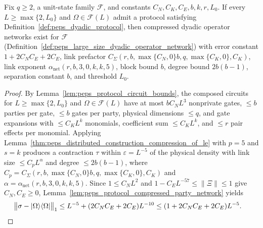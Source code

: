 \begin{lemma}
    \label{thm:peps_large_size_network_from_protocol}
    \leanok
    Fix $q\ge2$, a unit-state family $\mathcal F$, and constants
    $C_N,C_K,C_E,b,k,r,L_0$. If every $L\ge\max\{2,L_0\}$ and
    $\Omega\in\mathcal F(L)$ admit a protocol satisfying
    Definition~\ref{def:peps_dyadic_protocol}, then compressed dyadic operator
    networks exist for $\mathcal F$
    (Definition~\ref{def:peps_large_size_dyadic_operator_network}) with error
    constant $1+2C_NC_E+2C_E$, link prefactor
    $C_\Sigma(r,b,\max\{C_N,0\}b,q,\max\{C_K,0\},C_K)$, link exponent
    $\alpha_{\mathrm{net}}(r,b,3,0,k,k,5)$, block bound $b$, degree bound
    $2b(b-1)$, separation constant $b$, and threshold $L_0$.
\end{lemma}
\begin{proof}
    \leanok
    By Lemma~\ref{lem:peps_protocol_circuit_bounds}, the composed circuits for
    $L\ge\max\{2,L_0\}$ and $\Omega\in\mathcal F(L)$ have at most $bC_NL^3$
    nonprivate gates, $\le b$ parties per gate, $\le b$ gates per party,
    physical dimensions $\le q$, and gate expansions with $\le C_KL^k$
    monomials, coefficient sum $\le C_KL^k$, and $\le r$ pair effects per
    monomial. Applying
    Lemma~\ref{thm:peps_distributed_construction_compression_of_le} with
    $p=5$ and $s=k$ produces a contraction $\tau$ within $\varepsilon=L^{-5}$
    of the physical density with link size $\le C_pL^\alpha$ and degree
    $\le 2b(b-1)$, where
    $C_p=C_\Sigma(r,b,\max\{C_N,0\}b,q,\max\{C_K,0\},C_K)$ and
    $\alpha=\alpha_{\mathrm{net}}(r,b,3,0,k,k,5)$. Since $1\le C_NL^2$ and
    $1-C_EL^{-57}\le\lVert\Xi\rVert\le1$ give $C_N,C_E\ge0$,
    Lemma~\ref{lem:peps_protocol_compressed_party_network} yields
    \begin{align}
        \bigl\lVert\sigma-|\Omega\rangle\langle\Omega|\bigr\rVert_1
         & \le L^{-5}+(2C_NC_E+2C_E)L^{-10}\le(1+2C_NC_E+2C_E)L^{-5}. \notag
    \end{align}
\end{proof}
